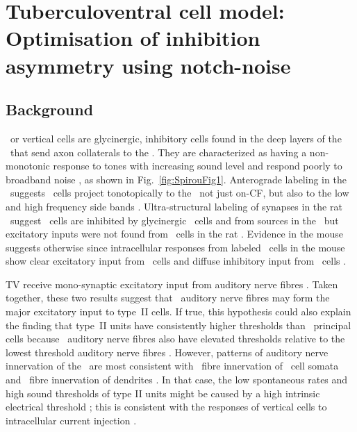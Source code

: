 \section[TV Cell Model]{Tuberculoventral cell model: Optimisation of inhibition asymmetry using notch-noise} \label{sec:TV-cell-model}

\subsection{Background}

\TV~or vertical cells are glycinergic, inhibitory cells found in the deep layers of the \DCN~that send axon collaterals to the \VCN\@.
They are characterized as having a non-monotonic response to tones with increasing sound level and respond poorly to broadband noise \citep{SpirouDavisEtAl:1999,NelkenYoung:1997,ReissYoung:2005}, as shown in Fig.~\ref{fig:SpirouFig1}.
Anterograde labeling in the \DCN~suggests \TV~cells project tonotopically to the \VCN~not just on-CF, but also to the low and high frequency side bands \citep{MunirathinamOstapoffEtAl:2004,OstapoffMorestEtAl:1999}.
Ultra-structural labeling of synapses in the rat \DCN~suggest \TV~cells are inhibited by glycinergic \DS~cells and from sources in the \DCN~but excitatory inputs were not found from \TS~cells in the rat \citep{Rubio:2005}.
Evidence in the mouse suggests otherwise since intracellular responses from labeled \TV~cells in the mouse show clear excitatory input from \TS~cells and diffuse inhibitory input from \DS~cells \citep{ZhangOertel:1993b,WickesbergOertel:1993}.


TV receive mono-synaptic excitatory input from auditory nerve fibres \citep{OertelWu:1989,ZhangOertel:1993b}.
Taken together, these two results suggest that \LSR~auditory nerve fibres may form the major excitatory input to type~II cells.
If true, this hypothesis could also explain the finding that type~II units have consistently higher thresholds than \DCN~principal cells \citep{YoungBrownell:1976} because \LSR~auditory nerve fibres also have elevated thresholds relative to the lowest threshold auditory nerve fibres \citep{Liberman:1978}.
However, patterns of auditory nerve innervation of the \DCN~are most consistent with \HSR~fibre innervation of \TV~cell somata and \LSR~fibre innervation of dendrites \citep{Liberman:1993}.
In that case, the low spontaneous rates and high sound thresholds of type II units might be caused by a high intrinsic electrical threshold \citep{HancockDavisEtAl:1997}; this is consistent with the responses of vertical cells to intracellular current injection \citep{DingVoigt:1997,ZhangOertel:1993b}.

